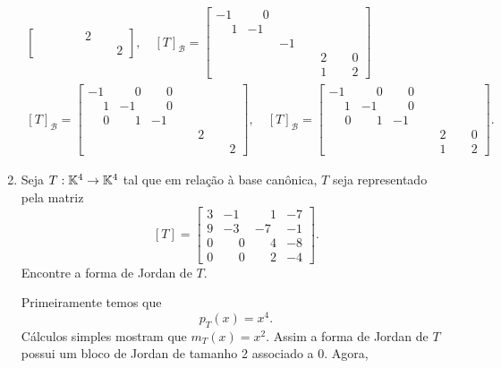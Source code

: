 \begin{exemplo}
\begin{enumerate}
\begin{solucao}
\begin{align*}
\begin{bmatrix}
					& & & \phantom{-}2 & \\
					& & & & \phantom{-}2
				\end{bmatrix}, \quad [T]_\mathcal{B} = \begin{bmatrix}
					-1 & \phantom{-}0 & & &\\
					\phantom{-}1 & -1 & & & \\
					\phantom{-1} &  & -1 & &\\
					& & & \phantom{-}2 & \phantom{-}0\\
					& & & \phantom{-}1 & \phantom{-}2
				\end{bmatrix}\\
				[T]_\mathcal{B} = \begin{bmatrix}
					-1 & \phantom{-}0 & \phantom{-}0 & &\\
					\phantom{-}1 & -1 & \phantom{-}0 & & \\
					\phantom{-} 0 & \phantom{-}1 & -1 & &\\
					& & & \phantom{-}2 & \\
					& & & & \phantom{-}2
				\end{bmatrix}, \quad [T]_\mathcal{B} = \begin{bmatrix}
					-1 & \phantom{-}0 & \phantom{-}0 & &\\
					\phantom{-}1 & -1 & \phantom{-}0 & & \\
					\phantom{-1}0 & \phantom{-}1 & -1 & &\\
					& & & \phantom{-}2 & \phantom{-}0\\
					& & & \phantom{-}1 & \phantom{-}2
				\end{bmatrix}.
			\end{align*}
		\end{solucao}
		\item Seja $T : \mathbb{K}^4 \to \mathbb{K}^4$ tal que em rela\c{c}\~ao \`a base can\^onica, $T$ seja representado pela matriz
		\[
			[T] = \begin{bmatrix}
				3 & -1 & \phantom{-}1 & -7\\
				9 & -3 & -7 & -1\\
				0 & \phantom{-}0 & \phantom{-}4 & -8\\
				0 & \phantom{-}0 & \phantom{-}2 & -4
			\end{bmatrix}.
		\]
		Encontre a forma de Jordan de $T$.
		\begin{solucao}
			Primeiramente temos que
			\[
				p_T(x) = x^4.
			\]
			C\'alculos simples mostram que $m_T(x) = x^2$. Assim a forma de Jordan de $T$ possui um bloco de Jordan de tamanho 2 associado a 0. Agora,

\end{solucao}
\end{enumerate}
\end{exemplo}
